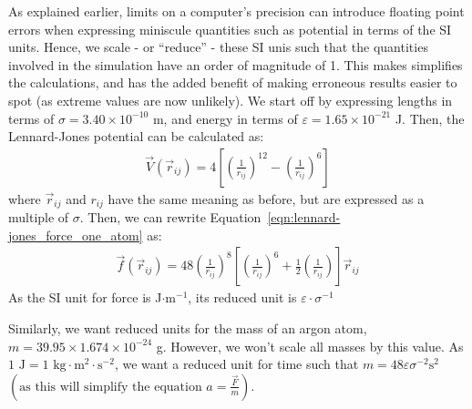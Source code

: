 \documentclass[../Main.tex]{subfiles}
\begin{document}
As explained earlier, limits on a computer's precision can introduce floating point errors when expressing miniscule quantities such as potential in terms of the SI units. Hence, we scale - or ``reduce'' - these SI unis such that the quantities involved in the simulation have an order of magnitude of 1. This makes simplifies the calculations, and has the added benefit of making erroneous results easier to spot (as extreme values are now unlikely). We start off by expressing lengths in terms of $\sigma = 3.40 \times 10^{-10}$ m, and energy in terms of $\varepsilon = 1.65 \times 10^{-21}$ J. Then, the Lennard-Jones potential can be calculated as:
\begin{align}
	\vec{V}\left(\vec{r}_{ij}\right) = 4 \left[ \left( \frac{1}{r_{ij}}\right)^{12} - \left( \frac{1}{r_{ij}}\right)^{6} \right] \label{eqn:lennard-jones_potential_reduced}
\end{align}
where $\vec{r}_{ij}$ and $r_{ij}$ have the same meaning as before, but are expressed as a multiple of $\sigma$.
Then, we can rewrite Equation~\ref{eqn:lennard-jones_force_one_atom} as:
\begin{align}
\vec{f}\left(\vec{r}_{ij}\right) = 48\left( \frac{1}{r_{ij}}\right)^{8} \left[ \left( \frac{1}{r_{ij}}\right)^{6} + \frac{1}{2}\left( \frac{1}{r_{ij}}\right)\right]\vec{r}_{ij} \label{eqn:lennard-jones_force_reduced_one_atom}
\end{align}
As the SI unit for force is J$\cdot\mbox{m}^{-1}$, its reduced unit is $\varepsilon\cdot\sigma^{-1}$

Similarly, we want reduced units for the mass of an argon atom, $m = 39.95 \times 1.674 \times 10^{-24}$ g. However, we won't scale all masses by this value. As $1\mbox{ J} = 1\mbox{ kg}\cdot\mbox{m}^{2}\cdot\mbox{s}^{-2}$, we want a reduced unit for time such that $m = 48\varepsilon\sigma^{-2}\mbox{s}^{2}$ $\left(\mbox{as this will simplify the equation }a = \frac{\vec{F}}{m}\right)$. 
\end{document}
